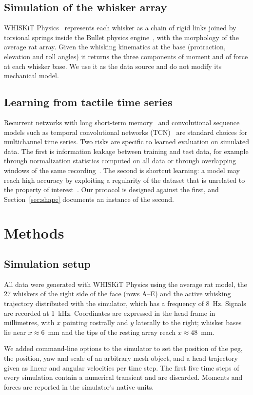 \documentclass[conference]{IEEEtran}
\begin{document}
\subsection{Simulation of the whisker array}
WHISKiT Physics~\cite{zweifel2021} represents each whisker as a chain of rigid links joined by torsional springs inside the Bullet physics engine~\cite{coumans2015}, with the morphology of the average rat array. Given the whisking kinematics at the base (protraction, elevation and roll angles) it returns the three components of moment and of force at each whisker base. We use it as the data source and do not modify its mechanical model.

\subsection{Learning from tactile time series}
Recurrent networks with long short-term memory~\cite{hochreiter1997} and convolutional sequence models such as temporal convolutional networks (TCN)~\cite{bai2018} are standard choices for multichannel time series. Two risks are specific to learned evaluation on simulated data. The first is information leakage between training and test data, for example through normalization statistics computed on all data or through overlapping windows of the same recording~\cite{kapoor2023}. The second is shortcut learning: a model may reach high accuracy by exploiting a regularity of the dataset that is unrelated to the property of interest~\cite{geirhos2020}. Our protocol is designed against the first, and Section~\ref{sec:shape} documents an instance of the second.

\section{Methods}
\subsection{Simulation setup}
All data were generated with WHISKiT Physics using the average rat model, the 27 whiskers of the right side of the face (rows A--E) and the active whisking trajectory distributed with the simulator, which has a frequency of 8~Hz. Signals are recorded at 1~kHz. Coordinates are expressed in the head frame in millimetres, with $x$ pointing rostrally and $y$ laterally to the right; whisker bases lie near $x\approx 6$~mm and the tips of the resting array reach $x\approx 48$~mm.

We added command-line options to the simulator to set the position of the peg, the position, yaw and scale of an arbitrary mesh object, and a head trajectory given as linear and angular velocities per time step. The first five time steps of every simulation contain a numerical transient and are discarded. Moments and forces are reported in the simulator's native units.
\end{document}
